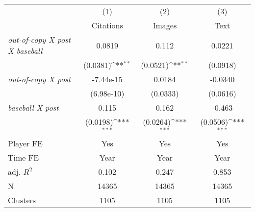 {
\def\sym#1{\ifmmode^{#1}\else\(^{#1}\)\fi}
\begin{tabular*}{\hsize}{@{\hskip\tabcolsep\extracolsep\fill}l*{3}{c}}
\toprule
            &\multicolumn{1}{c}{(1)}&\multicolumn{1}{c}{(2)}&\multicolumn{1}{c}{(3)}\\
            &\multicolumn{1}{c}{Citations}&\multicolumn{1}{c}{Images}&\multicolumn{1}{c}{Text}\\
\midrule
\emph{out-of-copy X post X baseball}&      0.0819         &       0.112         &      0.0221         \\
            &    (0.0381)\sym{**} &    (0.0521)\sym{**} &    (0.0918)         \\
\addlinespace
\emph{out-of-copy X post}&   -7.44e-15         &      0.0184         &     -0.0340         \\
            &  (6.98e-10)         &    (0.0333)         &    (0.0616)         \\
\addlinespace
\emph{baseball X post}&       0.115         &       0.162         &      -0.463         \\
            &    (0.0198)\sym{***}&    (0.0264)\sym{***}&    (0.0506)\sym{***}\\
\midrule
Player FE   &         Yes         &         Yes         &         Yes         \\
Time FE     &        Year         &        Year         &        Year         \\
adj. $R^2$  &       0.102         &       0.247         &       0.853         \\
N           &       14365         &       14365         &       14365         \\
Clusters    &        1105         &        1105         &        1105         \\
\bottomrule
\end{tabular*}
}
